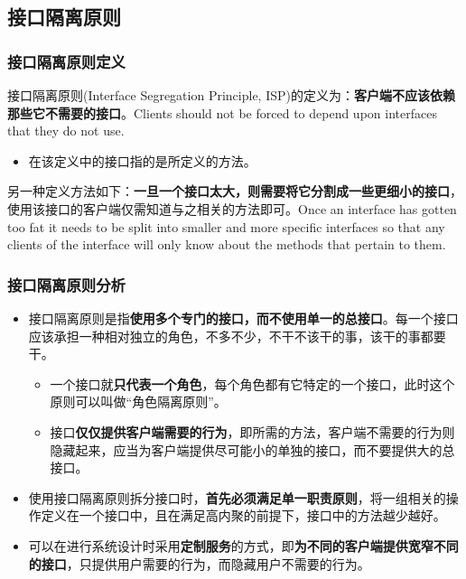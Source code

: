 \subsection{接口隔离原则}

\subsubsection{接口隔离原则定义}
接口隔离原则(Interface Segregation Principle, ISP)的定义为：\textbf{客户端不应该依赖那些它不需要的接口}。Clients should not be forced to depend upon interfaces that they do not use.
\begin{itemize}
    \item 在该定义中的接口指的是所定义的方法。
\end{itemize}

另一种定义方法如下：\textbf{一旦一个接口太大，则需要将它分割成一些更细小的接口}，使用该接口的客户端仅需知道与之相关的方法即可。Once an interface has gotten too fat it needs to be split into smaller and more specific interfaces so that any clients of the interface will only know about the methods that pertain to them.

\subsubsection{接口隔离原则分析}
\begin{itemize}
    \item 接口隔离原则是指\textbf{使用多个专门的接口，而不使用单一的总接口}。每一个接口应该承担一种相对独立的角色，不多不少，不干不该干的事，该干的事都要干。
    \begin{itemize}
        \item 一个接口就\textbf{只代表一个角色}，每个角色都有它特定的一个接口，此时这个原则可以叫做“角色隔离原则”。
        \item 接口\textbf{仅仅提供客户端需要的行为}，即所需的方法，客户端不需要的行为则隐藏起来，应当为客户端提供尽可能小的单独的接口，而不要提供大的总接口。
    \end{itemize}
    \item 使用接口隔离原则拆分接口时，\textbf{首先必须满足单一职责原则}，将一组相关的操作定义在一个接口中，且在满足高内聚的前提下，接口中的方法越少越好。
    \item 可以在进行系统设计时采用\textbf{定制服务}的方式，即\textbf{为不同的客户端提供宽窄不同的接口}，只提供用户需要的行为，而隐藏用户不需要的行为。
\end{itemize}

